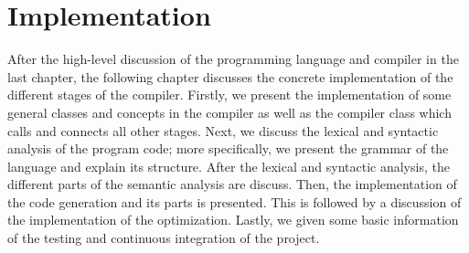 \chapter{Implementation}
\label{ch:implementation}
After the high-level discussion of the programming language and compiler in the last chapter, the following chapter discusses the concrete implementation of the different stages of the compiler. Firstly, we present the implementation of some general classes and concepts in the compiler as well as the compiler class which calls and connects all other stages. Next, we discuss the lexical and syntactic analysis of the program code; more specifically, we present the grammar of the language and explain its structure. After the lexical and syntactic analysis, the different parts of the semantic analysis are discuss. Then, the implementation of the code generation and its parts is presented. This is followed by a discussion of the implementation of the optimization. Lastly, we given some basic information of the testing and continuous integration of the project. 












